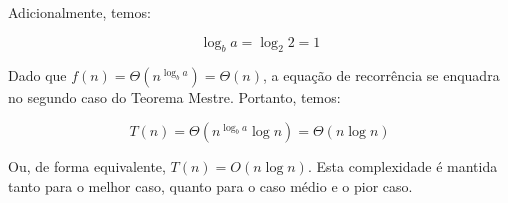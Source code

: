 Adicionalmente, temos:

\begin{equation}
    \log_b a = \log_2 2 = 1
\end{equation}

Dado que \( f(n) = \Theta(n^{\log_b a}) = \Theta(n) \), a equação de recorrência se enquadra no segundo caso do Teorema Mestre. Portanto, temos:

\begin{equation}
    T(n) = \Theta(n^{\log_b a}\log n) = \Theta(n \log n)
\end{equation}

Ou, de forma equivalente, \( T(n) = O(n \log n) \). Esta complexidade é mantida tanto para o melhor caso, quanto para o caso médio e o pior caso.
